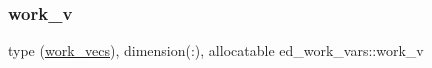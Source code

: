 \mbox{\label{namespaceed__work__vars_aad831dc3295b5ee4dbd0b01c0fe47e37}} 
\subsubsection{\texorpdfstring{work\+\_\+v}{work\_v}}
{\footnotesize\ttfamily type (\hyperlink{structed__work__vars_1_1work__vecs}{work\+\_\+vecs}), dimension(\+:), allocatable ed\+\_\+work\+\_\+vars\+::work\+\_\+v}

